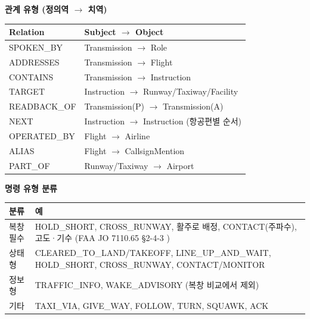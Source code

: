 \documentclass[10pt,a4paper]{article}
\begin{document}
\begin{minipage}[t]{0.5\textwidth}
\small\textbf{관계 유형 (정의역 $\to$ 치역)}\\[2pt]
\begin{tabularx}{\linewidth}{@{}>{\ttfamily\footnotesize}l>{\raggedright\arraybackslash\footnotesize}X@{}}
\toprule
\normalfont\textbf{Relation} & \textbf{Subject $\to$ Object}\\\midrule
SPOKEN\_BY & Transmission $\to$ Role\\
ADDRESSES & Transmission $\to$ Flight\\
CONTAINS & Transmission $\to$ Instruction\\
TARGET & Instruction $\to$ Runway/Taxiway/Facility\\
READBACK\_OF & Transmission(P) $\to$ Transmission(A)\\
NEXT & Instruction $\to$ Instruction (항공편별 순서)\\
OPERATED\_BY & Flight $\to$ Airline\\
ALIAS & Flight $\to$ CallsignMention\\
PART\_OF & Runway/Taxiway $\to$ Airport\\
\bottomrule
\end{tabularx}
\end{minipage}\hfill
\begin{minipage}[t]{0.47\textwidth}
\small\textbf{명령 유형 분류}\\[2pt]
\begin{tabularx}{\linewidth}{@{}>{\raggedright\arraybackslash\footnotesize}p{1.7cm}>{\raggedright\arraybackslash\footnotesize}X@{}}
\toprule
\textbf{분류} & \textbf{예}\\\midrule
복창 필수 & HOLD\_SHORT, CROSS\_RUNWAY, 활주로 배정, CONTACT(주파수), 고도·기수 (FAA JO 7110.65 §2-4-3 \cite{faa7110})\\
상태형 & CLEARED\_TO\_LAND/TAKEOFF, LINE\_UP\_AND\_WAIT, HOLD\_SHORT, CROSS\_RUNWAY, CONTACT/MONITOR\\
정보형 & TRAFFIC\_INFO, WAKE\_ADVISORY (복창 비교에서 제외)\\
기타 & TAXI\_VIA, GIVE\_WAY, FOLLOW, TURN, SQUAWK, ACK\\
\bottomrule
\end{tabularx}
\end{minipage}
\end{document}
